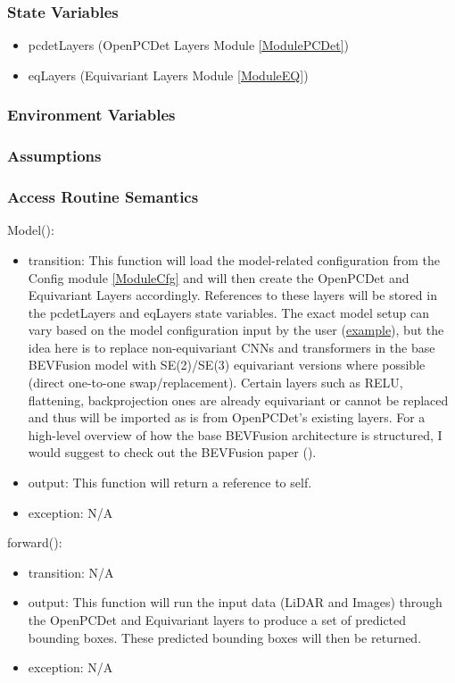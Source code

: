 \documentclass[12pt, titlepage]{article}
\begin{document}
\subsubsection{State Variables}
\begin{itemize}
  \item pcdetLayers (OpenPCDet Layers Module \ref{ModulePCDet})
  \item eqLayers (Equivariant Layers Module \ref{ModuleEQ})
\end{itemize}

\subsubsection{Environment Variables}


\subsubsection{Assumptions}

\subsubsection{Access Routine Semantics}
\noindent Model():
\begin{itemize}
\item transition: This function will load the model-related configuration from the Config module \ref{ModuleCfg} and will then create the OpenPCDet and Equivariant Layers accordingly. References to these layers will be stored in the pcdetLayers and eqLayers state variables. The exact model setup can vary based on the model configuration input by the user (\href{https://github.com/open-mmlab/OpenPCDet/blob/master/tools/cfgs/nuscenes_models/bevfusion.yaml}{example}), but the idea here is to replace non-equivariant CNNs and transformers in the base BEVFusion model with SE(2)/SE(3) equivariant versions where possible (direct one-to-one swap/replacement). Certain layers such as RELU, flattening, backprojection ones are already equivariant or cannot be replaced and thus will be imported as is from OpenPCDet's existing layers. For a high-level overview of how the base BEVFusion architecture is structured, I would suggest to check out the BEVFusion paper (\cite{liang2022bevfusion}).
\item output: This function will return a reference to self.
\item exception: N/A
\end{itemize}

\noindent forward():
\begin{itemize}
\item transition: N/A 
\item output: This function will run the input data (LiDAR and Images) through the OpenPCDet and Equivariant layers to produce a set of predicted bounding boxes. These predicted bounding boxes will then be returned. 
\item exception: N/A
\end{itemize}
\end{document}
